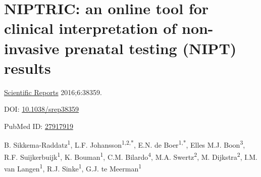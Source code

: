 \chapter[NIPTRIC: a tool for clinical interpretation of NIPT results]{NIPTRIC: an online tool for clinical interpretation of non-invasive prenatal testing (NIPT) results}
\label{chap:NIPTRIC}

{ \Large {} }

\hfill \underline{Scientific Reports} 2016;6:38359.

\hfill DOI: \href{https://doi.org/10.1038/srep38359}{10.1038/srep38359}

\hfill PubMed ID: \href{https://www.ncbi.nlm.nih.gov/pubmed/27917919}{27917919}

\newpage

\noindent
B. Sikkema-Raddatz\textsuperscript{1}, L.F. Johansson\textsuperscript{1,2,*}, E.N. de Boer\textsuperscript{1,*}, Elles M.J. Boon\textsuperscript{3}, R.F. Suijkerbuijk\textsuperscript{1}, K. Bouman\textsuperscript{1}, C.M. Bilardo\textsuperscript{4}, M.A. Swertz\textsuperscript{2}, M. Dijkstra\textsuperscript{2}, I.M. van Langen\textsuperscript{1}, R.J. Sinke\textsuperscript{1}, G.J. te Meerman\textsuperscript{1} \\

